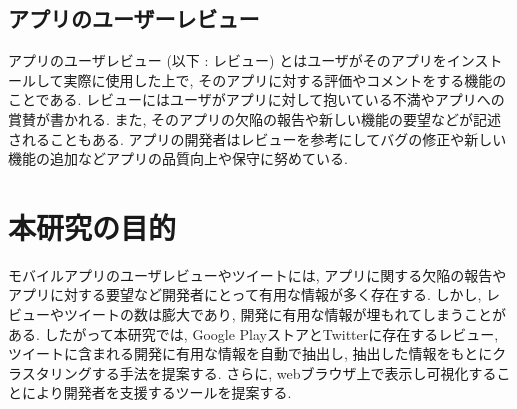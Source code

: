 \subsection{アプリのユーザーレビュー}
アプリのユーザレビュー (以下 : レビュー) とはユーザがそのアプリをインストールして実際に使用した上で, そのアプリに対する評価やコメントをする機能のことである. 
レビューにはユーザがアプリに対して抱いている不満やアプリへの賞賛が書かれる. また, そのアプリの欠陥の報告や新しい機能の要望などが記述されることもある. 
アプリの開発者はレビューを参考にしてバグの修正や新しい機能の追加などアプリの品質向上や保守に努めている. 


\section{本研究の目的}

モバイルアプリのユーザレビューやツイートには, アプリに関する欠陥の報告やアプリに対する要望など開発者にとって有用な情報が多く存在する. しかし, レビューやツイートの数は膨大であり, 開発に有用な情報が埋もれてしまうことがある. 
したがって本研究では, Google PlayストアとTwitterに存在するレビュー, ツイートに含まれる開発に有用な情報を自動で抽出し, 抽出した情報をもとにクラスタリングする手法を提案する. さらに, webブラウザ上で表示し可視化することにより開発者を支援するツールを提案する. 


